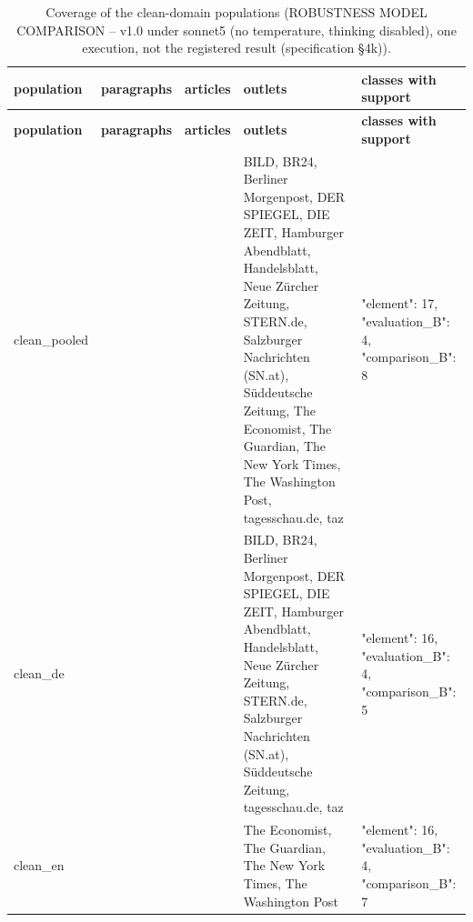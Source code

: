 \begingroup\footnotesize
\begin{longtable}{>{\raggedright\arraybackslash}p{66.8pt}>{\raggedright\arraybackslash}p{65.6pt}>{\raggedright\arraybackslash}p{52.9pt}>{\raggedright\arraybackslash}p{120.6pt}>{\raggedright\arraybackslash}p{89.2pt}}
\caption{Coverage of the clean-domain populations (ROBUSTNESS MODEL COMPARISON -- v1.0 under sonnet5 (no temperature, thinking disabled), one execution, not the registered result (specification §4k)).} \\
\toprule
\textbf{population} & \textbf{paragraphs} & \textbf{articles} & \textbf{outlets} & \textbf{classes with support} \\
\midrule
\endfirsthead
\toprule
\textbf{population} & \textbf{paragraphs} & \textbf{articles} & \textbf{outlets} & \textbf{classes with support} \\
\midrule
\endhead
\bottomrule
\endfoot
clean\_\allowbreak{}pooled & 105 & 50 & BILD, BR24, Berliner Morgenpost, DER SPIEGEL, DIE ZEIT, Hamburger Abendblatt, Handelsblatt, Neue Zürcher Zeitung, STERN.de, Salzburger Nachrichten (SN.at), Süddeutsche Zeitung, The Economist, The Guardian, The New York Times, The Washington Post, tagesschau.de, taz & {"element":\allowbreak{} 17, "evaluation\_\allowbreak{}B":\allowbreak{} 4, "comparison\_\allowbreak{}B":\allowbreak{} 8} \\
clean\_\allowbreak{}de & 49 & 24 & BILD, BR24, Berliner Morgenpost, DER SPIEGEL, DIE ZEIT, Hamburger Abendblatt, Handelsblatt, Neue Zürcher Zeitung, STERN.de, Salzburger Nachrichten (SN.at), Süddeutsche Zeitung, tagesschau.de, taz & {"element":\allowbreak{} 16, "evaluation\_\allowbreak{}B":\allowbreak{} 4, "comparison\_\allowbreak{}B":\allowbreak{} 5} \\
clean\_\allowbreak{}en & 56 & 26 & The Economist, The Guardian, The New York Times, The Washington Post & {"element":\allowbreak{} 16, "evaluation\_\allowbreak{}B":\allowbreak{} 4, "comparison\_\allowbreak{}B":\allowbreak{} 7} \\
\end{longtable}
\endgroup
